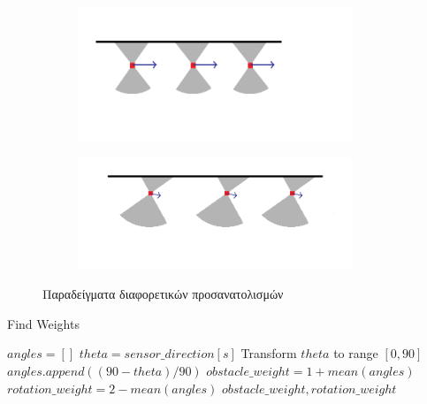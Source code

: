 \begin{figure}[!htb]
     \begin{subfigure}[b]{0.5\textwidth}
         \centering
         \includegraphics[width=0.9\textwidth]{./images/chapter5/set_one_side.png}
         \label{fig:set_one_side}
     \end{subfigure}%
     \begin{subfigure}[b]{0.5\textwidth}
         \centering
         \includegraphics[width=0.9\textwidth]{./images/chapter5/set_two_side.png}
         \label{fig:set_two_side}
     \end{subfigure}
    \caption{Παραδείγματα διαφορετικών προσανατολισμών}
    \label{fig:different_yaw_examples}
\end{figure}


\begin{algorithm}[!htb]
\caption{Find Weights}
\label{alg:find_weights}
\begin{algorithmic}[1]
        \State $angles = []$
            \State $theta = sensor\_direction[s]$
            \State Transform $theta$ to range $[0,90]$
            \State $angles.append((90-theta)/90)$
        \EndFor
        \State $obstacle\_weight = 1 + mean(angles)$
        \State $rotation\_weight = 2 - mean(angles)$
        \State \Return $obstacle\_weight, rotation\_weight$
\end{algorithmic}
\end{algorithm}



